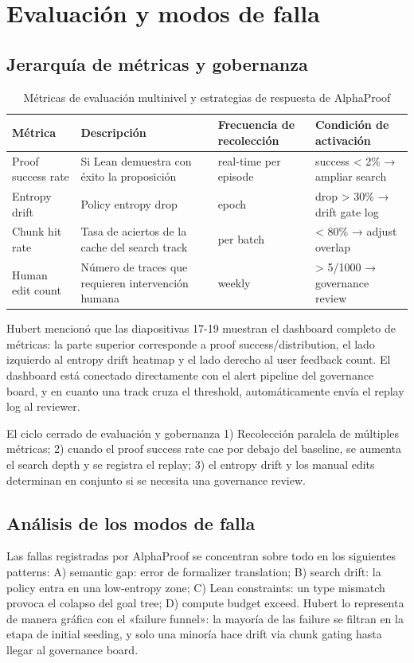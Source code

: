 \section{Evaluación y modos de falla}

\subsection{Jerarquía de métricas y gobernanza}
\begin{table}[H]
\centering
\begin{tabular}{p{3.5cm}p{4cm}p{3.5cm}p{3cm}}
\toprule
Métrica & Descripción & Frecuencia de recolección & Condición de activación \\
\midrule
Proof success rate & Si Lean demuestra con éxito la proposición & real-time per episode & success < 2\% → ampliar search \\
Entropy drift & Policy entropy drop & epoch & drop > 30\% → drift gate log \\
Chunk hit rate & Tasa de aciertos de la cache del search track & per batch & < 80\% → adjust overlap \\
Human edit count & Número de traces que requieren intervención humana & weekly & > 5/1000 → governance review \\
\bottomrule
\end{tabular}
\caption{Métricas de evaluación multinivel y estrategias de respuesta de AlphaProof}
\end{table}

Hubert mencionó que las diapositivas 17-19 muestran el dashboard completo de métricas: la parte superior corresponde a proof success/distribution, el lado izquierdo al entropy drift heatmap y el lado derecho al user feedback count. El dashboard está conectado directamente con el alert pipeline del governance board, y en cuanto una track cruza el threshold, automáticamente envía el replay log al reviewer.

\begin{importantbox}{El ciclo cerrado de evaluación y gobernanza}
1) Recolección paralela de múltiples métricas; 2) cuando el proof success rate cae por debajo del baseline, se aumenta el search depth y se registra el replay; 3) el entropy drift y los manual edits determinan en conjunto si se necesita una governance review.
\end{importantbox}

\subsection{Análisis de los modos de falla}
Las fallas registradas por AlphaProof se concentran sobre todo en los siguientes patterns: A) semantic gap: error de formalizer translation; B) search drift: la policy entra en una low-entropy zone; C) Lean constraints: un type mismatch provoca el colapso del goal tree; D) compute budget exceed. Hubert lo representa de manera gráfica con el «failure funnel»: la mayoría de las failure se filtran en la etapa de initial seeding, y solo una minoría hace drift via chunk gating hasta llegar al governance board.

